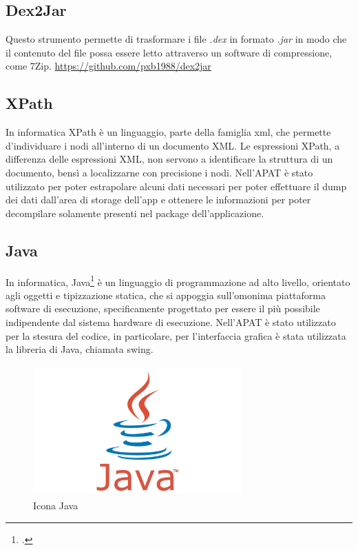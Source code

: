 \subsection*{Dex2Jar}
Questo strumento permette di trasformare i file \textit{.dex} in formato \textit{.jar} in modo
che il contenuto del file possa essere letto attraverso un software di compressione, come 7Zip.
\url{https://github.com/pxb1988/dex2jar}

\subsection*{XPath}\label{subsec:xpath}
In informatica XPath è un linguaggio, parte della famiglia \gls{xml}, che permette d'individuare i nodi all'interno di un documento XML. Le espressioni XPath, a differenza delle espressioni XML, non servono a identificare la struttura di un documento, bensì a localizzarne con precisione i nodi.
Nell'APAT è stato utilizzato per poter estrapolare alcuni dati necessari per poter effettuare il dump dei dati dall'area di storage dell'app e ottenere le informazioni per poter decompilare solamente presenti nel package dell'applicazione.

\subsection*{Java}
In informatica, Java\footcite{womak:effective-java} è un linguaggio di programmazione ad alto livello, orientato agli oggetti e tipizzazione statica, che si appoggia sull'omonima piattaforma software di esecuzione, specificamente progettato per essere il più possibile indipendente dal sistema hardware di esecuzione.
Nell'APAT è stato utilizzato per la stesura del codice, in particolare, per l'interfaccia grafica è stata utilizzata la libreria di Java, chiamata \gls{swing}.
\begin{figure}[H]
    \centering
    \includegraphics[width=8cm, height=5cm]{./immagini/java.jpg}
    \caption{Icona Java}\label{fig:java}
\end{figure}


